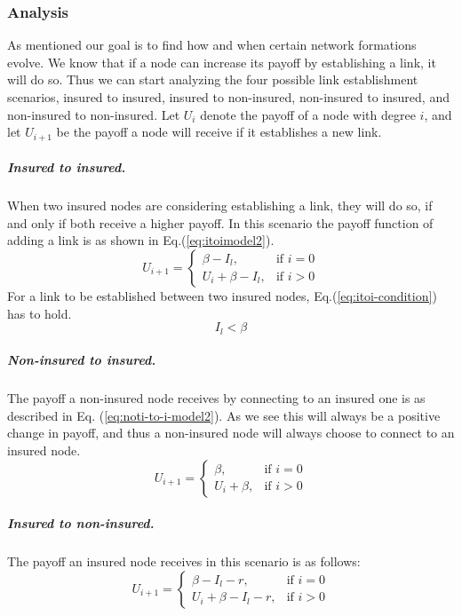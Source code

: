 \subsubsection{Analysis}
As mentioned our goal is to find how and when certain network formations evolve. We know that if a node can increase its payoff by establishing a link, it will do so. Thus we can start analyzing the four possible link establishment scenarios, insured to insured, insured to non-insured, non-insured to insured, and non-insured to non-insured. 
Let $U_{i}$ denote the payoff of a node with degree $i$, and let $U_{i+1}$ be the payoff a node will receive if it establishes a new link.
\subparagraph{Insured to insured.}
When two insured nodes are considering establishing a link, they will do so, if and only if both receive a higher payoff.  In this scenario the payoff function of adding a link is as shown in Eq.(\ref{eq:itoimodel2}).
\begin{equation}
    U_{i+1}= 
\begin{cases}
    \beta - I_{l},& \text{if } i = 0\\
    U_{i}+\beta -I_{l},& \text{if }  i>0
   
\end{cases}
\label{eq:itoimodel2}
\end{equation}
For a link to be established between two insured nodes, Eq.(\ref{eq:itoi-condition}) has to hold.
\begin{equation}
I_{l}<\beta
\label{eq:itoi-condition}
\end{equation}
\subparagraph{Non-insured to insured.}
The payoff a non-insured node receives by connecting to an insured one is as described in Eq. (\ref{eq:noti-to-i-model2}). As we see this will always be a positive change in payoff, and thus a non-insured node will always choose to connect to an insured node.
\begin{equation}
    U_{i+1}= 
\begin{cases}
    \beta,& \text{if } i = 0\\
    U_{i}+\beta,& \text{if }  i>0
   
\end{cases}
\label{eq:noti-to-i-model2}
\end{equation}
\subparagraph{Insured to non-insured.}
The payoff an insured node receives in this scenario is as follows:
\begin{equation}
    U_{i+1}= 
\begin{cases}
    \beta - I_{l}-r,& \text{if } i = 0\\
    U_{i}+\beta -I_{l}-r,& \text{if }  i>0
   
\end{cases}
\label{eq:itonotimodel2}
\end{equation}
